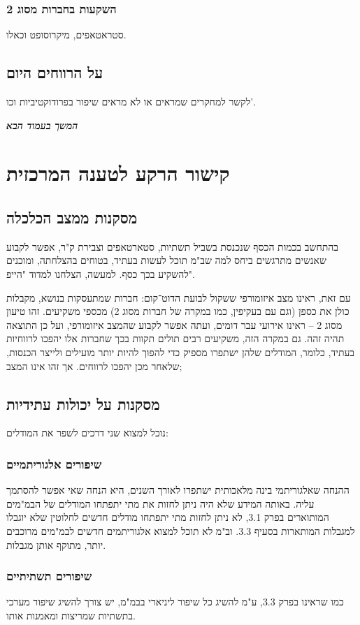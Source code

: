 \documentclass[]{article}
\newcommand\npage {\vfil {\hfil \textbf{\textit{המשך בעמוד הבא}}} \hfil \vfil \pagebreak}
\theoremstyle{definition}
\begin{document}
	\subsubsection{השקעות בחברות מסוג 2}
	סטראטאפים, מיקרוסופט וכאלו. 
	
	\subsection{על הרווחים היום}
	לקשר למחקרים שמראים או לא מראים שיפור בפרודוקטיביות וכו'. 
	
	\npage
	\section{קישור הרקע לטענה המרכזית}
	\subsection{מסקנות ממצב הכלכלה}
	בהתחשב בכמות הכסף שנכנסת בשביל תשתיות, סטארטאפים וצבירת ק"ר, אפשר לקבוע שאנשים מתרגשים ביחס למה שב"מ תוכל לעשות בעתיד, בטוחים בהצלחתה, ומוכנים להשקיע בכך כסף. למעשה, הצלחנו למדוד "הייפ". 
	
	עם זאת, ראינו מצב איזומורפי ששקול לבועת הדוט־קום: חברות שמתעסקות בנושא, מקבלות כולן את כספן (וגם עם בעקיפין, כמו במקרה של חברות מסוג 2) מכספי משקיעים. זהו טיעון מסוג 2 – ראינו אירועי עבר דומים, ועתה אפשר לקבוע שהמצב איזומורפי, ועל כן התוצאה תהיה זהה. גם במקרה הזה, משקיעים רבים תולים תקוות בכך שחברות אלו יהפכו לרווחיות בעתיד, כלומר, המודלים שלהן ישתפרו מספיק כדי להפוך להיות יותר מועילים ולייצר הכנסות, שלאחר מכן יהפכו לרווחים. אך זהו אינו המצב;
	
	\subsection{מסקנות על יכולות עתידיות}
	נוכל למצוא שני דרכים לשפר את המודלים: 
	
	\subsubsection{שיפורים אלגוריתמיים}
	ההנחה שאלגוריתמי בינה מלאכותית ישתפרו לאורך השנים, היא הנחה שאי אפשר להסתמך עליה. באותה המידע שלא היה ניתן לחזות את מתי יתפתחו המודלים של הבמ"מים המותוארים בפרק 3.1, לא ניתן לחזות מתי יתפתחו מודלים חדשים לחלוטין שלא יוגבלו למגבלות המותארות בסעיף 3.3. וב"מ לא תוכל למצוא אלגוריתמים חדשים לבמ"מים מרוכבים יותר, מתוקף אותן מגבלות. 
	\subsubsection{שיפורים תשתיתיים}
	כמו שראינו בפרק 3.3, ע"מ להשיג כל שיפור ליניארי בבמ"מ, יש צורך להשיג שיפור מערכי בתשתיות שמריצות ומאמנות אותו. 
	
\end{document}

